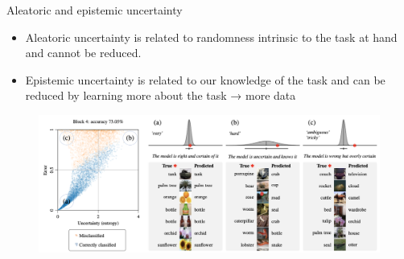     \begin{frame}{Aleatoric and epistemic uncertainty}
        \begin{itemize}
            \item Aleatoric uncertainty is related to randomness intrinsic to the task at hand and cannot be reduced. 
            \item Epistemic uncertainty is related to our knowledge of the task and can be reduced by learning more about the task → more data
        \end{itemize}
    \begin{figure}
            \centering
            \includegraphics[width=0.7\linewidth]{Screenshot 2025-04-08 at 15.14.46.png}
            \label{fig:enter-label}
        \end{figure}
            
    \end{frame}
    
